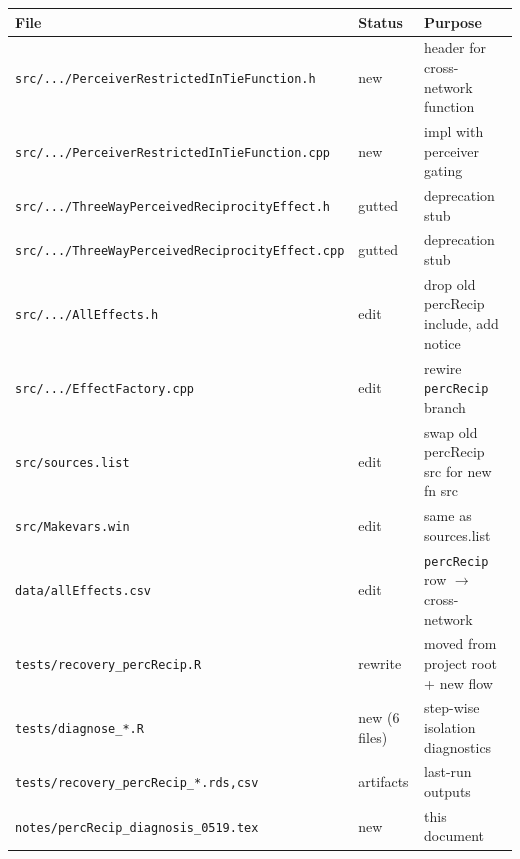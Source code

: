 \documentclass[11pt]{article}
\newcommand{\file}[1]{\texttt{#1}}
\begin{document}
\begin{tabular}{@{}lll@{}}
\toprule
File & Status & Purpose \\
\midrule
\file{src/.../PerceiverRestrictedInTieFunction.h} & new   & header for cross-network function\\
\file{src/.../PerceiverRestrictedInTieFunction.cpp} & new & impl with perceiver gating\\
\file{src/.../ThreeWayPerceivedReciprocityEffect.h} & gutted & deprecation stub\\
\file{src/.../ThreeWayPerceivedReciprocityEffect.cpp} & gutted & deprecation stub\\
\file{src/.../AllEffects.h} & edit & drop old percRecip include, add notice\\
\file{src/.../EffectFactory.cpp} & edit & rewire \texttt{percRecip} branch\\
\file{src/sources.list} & edit & swap old percRecip src for new fn src\\
\file{src/Makevars.win} & edit & same as sources.list\\
\file{data/allEffects.csv} & edit & \texttt{percRecip} row $\to$ cross-network\\
\file{tests/recovery\_percRecip.R} & rewrite & moved from project root + new flow\\
\file{tests/diagnose\_*.R} & new (6 files) & step-wise isolation diagnostics\\
\file{tests/recovery\_percRecip\_*.{rds,csv}} & artifacts & last-run outputs\\
\file{notes/percRecip\_diagnosis\_0519.tex} & new & this document\\
\bottomrule
\end{tabular}
\end{document}
